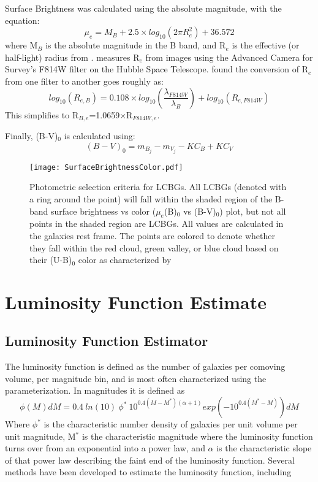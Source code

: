 \documentclass[manuscript]{aastex61}
\begin{document}
Surface Brightness was calculated using the absolute magnitude, with the equation:
\begin{equation}
\mu_{e}=M_{B}+2.5\times log_{10}(2\pi R_{e}^{2})+36.572
\label{eq:equation 3}
\end{equation}
where M$_{B}$ is the absolute magnitude in the B band, and R$_{e}$ is the effective (or half-light) radius from \citet{2009A&A...503..379T}. \citet{2009A&A...503..379T} measures R$_{e}$ from images using the Advanced Camera for Survey's F814W filter on the Hubble Space Telescope. \citet{2015MNRAS.447.2603L} found the conversion of R$_{e}$ from one filter to another goes roughly as:
\begin{equation}
log_{10}(R_{e,B})=0.108\times log_{10}\left(\frac{\lambda_{F814W}}{\lambda_{B}}\right)+log_{10}(R_{e,F814W})
\label{eq:equation 4}
\end{equation}
This simplifies to R$_{B,e}$=1.0659$\times$R$_{F814W,e}$. 

Finally, (B-V)$_{0}$ is calculated using:
\begin{equation}
(B-V)_{0}=m_{B_{j}}-m_{V_{j}}-KC_{B}+KC_{V}
\label{eq:equation 5}
\end{equation}
\begin{figure*}
\texttt{[image: SurfaceBrightnessColor.pdf]}
\caption{Photometric selection criteria for LCBGs. All LCBGs (denoted with a ring around the point) will fall within the shaded region of the B-band surface brightness vs color ($\mu_{e}$(B)$_{0}$ vs (B-V)$_{0}$) plot, but not all points in the shaded region are LCBGs. All values are calculated in the galaxies rest frame. The points are colored to denote whether they fall within the red cloud, green valley, or blue cloud based on their (U-B)$_{0}$ color as characterized by \citet{2006ApJ...647..853W}}
\end{figure*}

\section{Luminosity Function Estimate}
\label{LFE}
\subsection{Luminosity Function Estimator}
The luminosity function is defined as the number of galaxies per comoving volume, per magnitude bin, and is most often characterized using the \citet{1976ApJ...203..297S} parameterization. In magnitudes it is defined as 
\begin{equation}
\phi(M)dM=0.4~ln(10)~\phi^{*}~10^{0.4(M-M^{*})(\alpha+1)}exp(-10^{0.4(M^{*}-M)})dM
\label{eq:equation 6}
\end{equation}
Where $\phi^{*}$ is the characteristic number density of galaxies per unit volume per unit magnitude, M$^{*}$ is the characteristic magnitude where the luminosity function turns over from an exponential into a power law, and $\alpha$ is the characteristic slope of that power law describing the faint end of the luminosity function.
Several methods have been developed to estimate the luminosity function, including \citet{1968ApJ...151..393S,1971MNRAS.155...95L,1979ApJ...231..645T,1979ApJ...234..775T,1986MNRAS.223....1C,1988MNRAS.232..431E}
\end{document}
